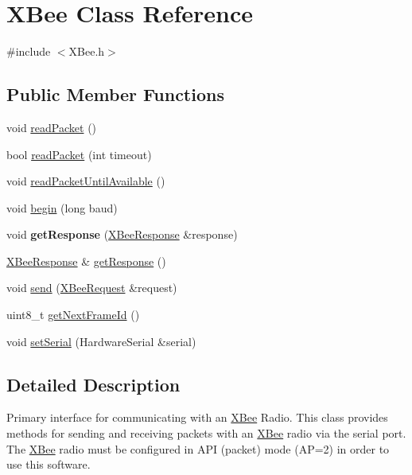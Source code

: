 \hypertarget{classXBee}{\section{\-X\-Bee \-Class \-Reference}
\label{classXBee}
}


{\ttfamily \#include $<$\-X\-Bee.\-h$>$}

\subsection*{\-Public \-Member \-Functions}
\begin{DoxyCompactItemize}
\item 
void \hyperlink{classXBee_a7d788232f44e8b3c10dc686a0299fcc6}{read\-Packet} ()
\item 
bool \hyperlink{classXBee_ae1c9f3b53df50564ab9aca2716792b44}{read\-Packet} (int timeout)
\item 
void \hyperlink{classXBee_a594e2bb2ccb7b3fe7a2278b9324b4083}{read\-Packet\-Until\-Available} ()
\item 
void \hyperlink{classXBee_a847a36fa06c9567496a7ec140cb72586}{begin} (long baud)
\item 
\hypertarget{classXBee_ac88079aa744d36b26a0c6a0add939898}{void {\bfseries get\-Response} (\hyperlink{classXBeeResponse}{\-X\-Bee\-Response} \&response)}\label{classXBee_ac88079aa744d36b26a0c6a0add939898}

\item 
\hyperlink{classXBeeResponse}{\-X\-Bee\-Response} \& \hyperlink{classXBee_a18250def80e8b643aa1ccc15a98937f3}{get\-Response} ()
\item 
void \hyperlink{classXBee_a802387f468be8622941d16739ac848f2}{send} (\hyperlink{classXBeeRequest}{\-X\-Bee\-Request} \&request)
\item 
uint8\-\_\-t \hyperlink{classXBee_a25bd226e41517e8a66a13e531d31438d}{get\-Next\-Frame\-Id} ()
\item 
void \hyperlink{classXBee_a8522ebba19c2751677131b7bb43da6c3}{set\-Serial} (\-Hardware\-Serial \&serial)
\end{DoxyCompactItemize}


\subsection{\-Detailed \-Description}
\-Primary interface for communicating with an \hyperlink{classXBee}{\-X\-Bee} \-Radio. \-This class provides methods for sending and receiving packets with an \hyperlink{classXBee}{\-X\-Bee} radio via the serial port. \-The \hyperlink{classXBee}{\-X\-Bee} radio must be configured in \-A\-P\-I (packet) mode (\-A\-P=2) in order to use this software. 

